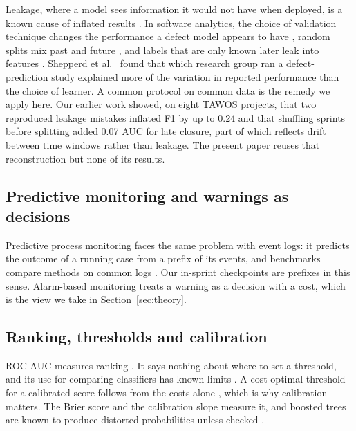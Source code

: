 Leakage, where a model sees information it would not have when deployed, is a known cause of inflated results \cite{kaufman2012,kapoor2023}. In software analytics, the choice of validation technique changes the performance a defect model appears to have \cite{tanti2017}, random splits mix past and future \cite{bangash2020,falessi2020}, and labels that are only known later leak into features \cite{jimenez2019}. Shepperd et al.\ \cite{shepperd2014} found that which research group ran a defect-prediction study explained more of the variation in reported performance than the choice of learner. A common protocol on common data is the remedy we apply here. Our earlier work \cite{abusharkh2027} showed, on eight TAWOS projects, that two reproduced leakage mistakes inflated F1 by up to 0.24 and that shuffling sprints before splitting added 0.07 AUC for late closure, part of which reflects drift between time windows rather than leakage. The present paper reuses that reconstruction but none of its results.

\subsection{Predictive monitoring and warnings as decisions}

Predictive process monitoring \cite{marquez2018,teinemaa2019} faces the same problem with event logs: it predicts the outcome of a running case from a prefix of its events, and benchmarks compare methods on common logs \cite{difrancesco2018,teinemaa2019}. Our in-sprint checkpoints are prefixes in this sense. Alarm-based monitoring \cite{fahrenkrog2022} treats a warning as a decision with a cost, which is the view we take in Section~\ref{sec:theory}.

\subsection{Ranking, thresholds and calibration}

ROC-AUC measures ranking \cite{fawcett2006}. It says nothing about where to set a threshold, and its use for comparing classifiers has known limits \cite{hand2009,hernandez2012}. A cost-optimal threshold for a calibrated score follows from the costs alone \cite{elkan2001}, which is why calibration matters. The Brier score \cite{brier1950} and the calibration slope \cite{vancalster2019} measure it, and boosted trees are known to produce distorted probabilities unless checked \cite{niculescu2005}.


